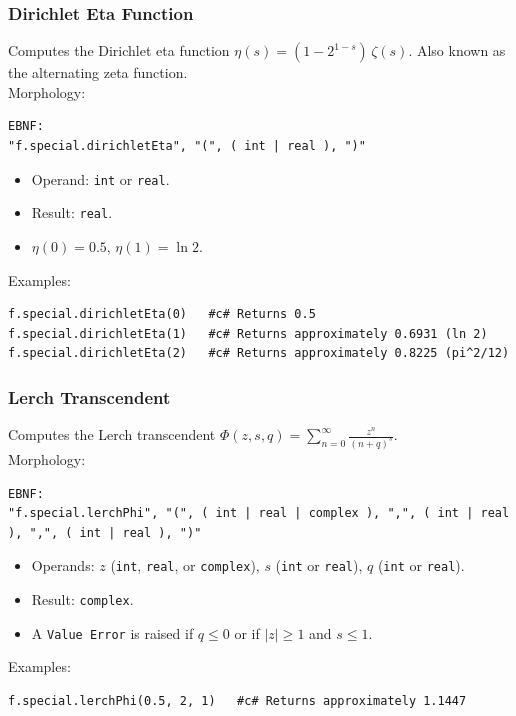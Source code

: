 \subsubsection{Dirichlet Eta Function}
Computes the Dirichlet eta function $\eta(s) = (1 - 2^{1-s})\,\zeta(s)$. Also known as the alternating zeta function. \\
Morphology:
\begin{verbatim}
EBNF:
"f.special.dirichletEta", "(", ( int | real ), ")"
\end{verbatim}
\begin{itemize}
\item Operand: \texttt{int} or \texttt{real}.
\item Result: \texttt{real}.
\item $\eta(0) = 0.5$, $\eta(1) = \ln 2$.
\end{itemize}
Examples:
\begin{verbatim}
f.special.dirichletEta(0)   #c# Returns 0.5
f.special.dirichletEta(1)   #c# Returns approximately 0.6931 (ln 2)
f.special.dirichletEta(2)   #c# Returns approximately 0.8225 (pi^2/12)
\end{verbatim}

\subsubsection{Lerch Transcendent}
Computes the Lerch transcendent $\Phi(z, s, q) = \sum_{n=0}^{\infty} \frac{z^n}{(n+q)^s}$. \\
Morphology:
\begin{verbatim}
EBNF:
"f.special.lerchPhi", "(", ( int | real | complex ), ",", ( int | real ), ",", ( int | real ), ")"
\end{verbatim}
\begin{itemize}
\item Operands: $z$ (\texttt{int}, \texttt{real}, or \texttt{complex}), $s$ (\texttt{int} or \texttt{real}), $q$ (\texttt{int} or \texttt{real}).
\item Result: \texttt{complex}.
\item A \texttt{Value Error} is raised if $q \leq 0$ or if $|z| \geq 1$ and $s \leq 1$.
\end{itemize}
Examples:
\begin{verbatim}
f.special.lerchPhi(0.5, 2, 1)   #c# Returns approximately 1.1447
\end{verbatim}

